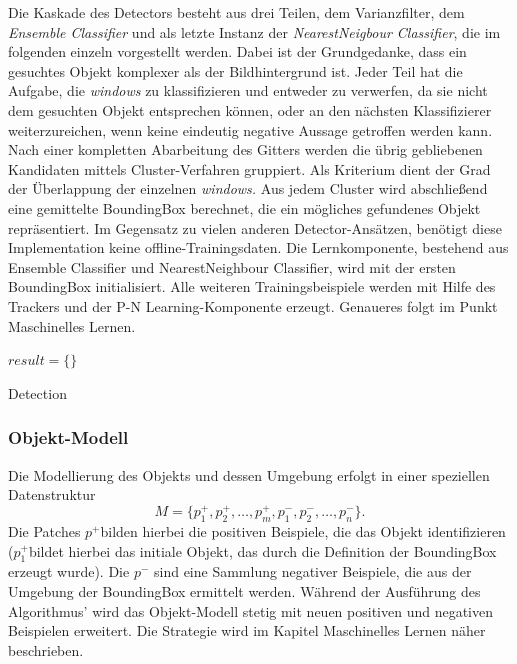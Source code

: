 	Die Kaskade des Detectors besteht aus drei Teilen, dem Varianzfilter, dem \textit{Ensemble Classifier} und als letzte Instanz der \textit{NearestNeigbour Classifier}, die im folgenden einzeln vorgestellt werden. Dabei ist der Grundgedanke, dass ein gesuchtes Objekt komplexer als der Bildhintergrund ist. Jeder Teil hat die Aufgabe, die \textit{windows} zu klassifizieren und entweder zu verwerfen, da sie nicht dem gesuchten Objekt entsprechen können, oder an den nächsten Klassifizierer weiterzureichen, wenn keine eindeutig negative Aussage getroffen werden kann. Nach einer kompletten Abarbeitung des Gitters werden die übrig gebliebenen Kandidaten mittels Cluster-Verfahren gruppiert. Als Kriterium dient der Grad der Überlappung der einzelnen \textit{windows.} Aus jedem Cluster wird abschließend eine gemittelte BoundingBox berechnet, die ein mögliches gefundenes Objekt repräsentiert. Im Gegensatz zu vielen anderen Detector-Ansätzen, benötigt diese Implementation keine offline-Trainingsdaten. Die Lernkomponente, bestehend aus Ensemble Classifier und NearestNeighbour Classifier, wird mit der ersten BoundingBox initialisiert. Alle weiteren Trainingsbeispiele werden mit Hilfe des Trackers und der P-N Learning-Komponente erzeugt. Genaueres folgt im Punkt Maschinelles Lernen.

	\begin{algorithm}
	\vspace{0.2cm}
	$result = \{\}$\;
	\caption{Detection}
	\label{alg:detection}
	\vspace{0.2cm}
	\end{algorithm}

	\subsubsection{Objekt-Modell}
	Die Modellierung des Objekts und dessen Umgebung erfolgt in einer speziellen Datenstruktur
	\begin{equation}
	M=\{p_{1}^{+},p_{2}^{+},\dots,p_{m}^{+},p_{1}^{-},p_{2}^{-},\dots,p_{n}^{-}\}.
	\end{equation}
	Die Patches $p^{+}$bilden hierbei die positiven Beispiele, die das Objekt identifizieren ($p_{1}^{+}$bildet hierbei das initiale Objekt, das durch die Definition der BoundingBox erzeugt wurde). Die $p^{-}$ sind eine Sammlung negativer Beispiele, die aus der Umgebung der BoundingBox ermittelt werden. Während der Ausführung des Algorithmus' wird das Objekt-Modell stetig mit neuen positiven und negativen Beispielen erweitert. Die Strategie wird im Kapitel Maschinelles Lernen näher beschrieben.

